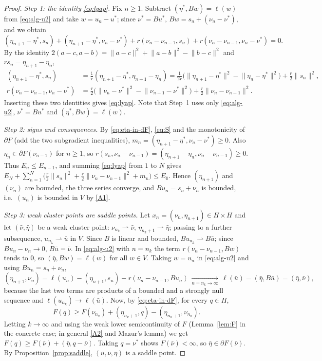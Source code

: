\documentclass[11pt]{amsart}
\theoremstyle{definition}
\theoremstyle{remark}
\numberwithin{equation}{section}
\newcommand{\norm}[1]{\lVert #1\rVert}
\newcommand{\weak}{\rightharpoonup}
\begin{document}
\begin{proof}
\emph{Step 1: the identity \eqref{eq:lyap}.} Fix $n\ge1$. Subtract $(\eta^*,Bw)=\ell(w)$ from \eqref{eq:alg-u2} and take $w=u_n-u^*$; since $\nu^*=Bu^*$, $Bw=s_n+(\nu_n-\nu^*)$, and we obtain
\[
(\eta_{n+1}-\eta^*,s_n)+(\eta_{n+1}-\eta^*,\nu_n-\nu^*)+r(\nu_n-\nu_{n-1},s_n)+r(\nu_n-\nu_{n-1},\nu_n-\nu^*)=0 .
\]
By the identity $2(a-c,a-b)=\norm{a-c}^2+\norm{a-b}^2-\norm{b-c}^2$ and $rs_n=\eta_{n+1}-\eta_n$,
\begin{align*}
(\eta_{n+1}-\eta^*,s_n)&=\frac1r(\eta_{n+1}-\eta^*,\eta_{n+1}-\eta_n)=\frac1{2r}\big(\norm{\eta_{n+1}-\eta^*}^2-\norm{\eta_n-\eta^*}^2\big)+\frac r2\norm{s_n}^2,\\
r(\nu_n-\nu_{n-1},\nu_n-\nu^*)&=\frac r2\big(\norm{\nu_n-\nu^*}^2-\norm{\nu_{n-1}-\nu^*}^2\big)+\frac r2\norm{\nu_n-\nu_{n-1}}^2 .
\end{align*}
Inserting these two identities gives \eqref{eq:lyap}. Note that Step~1 uses only \eqref{eq:alg-u2}, $\nu^*=Bu^*$ and $(\eta^*,Bw)=\ell(w)$.

\emph{Step 2: signs and consequences.} By \eqref{eq:eta-in-dF}, \eqref{eq:S} and the monotonicity of $\partial F$ (add the two subgradient inequalities), $m_n=(\eta_{n+1}-\eta^*,\nu_n-\nu^*)\ge0$. Also $\eta_n\in\partial F(\nu_{n-1})$ for $n\ge1$, so $r(s_n,\nu_n-\nu_{n-1})=(\eta_{n+1}-\eta_n,\nu_n-\nu_{n-1})\ge0$. Thus $E_n\le E_{n-1}$, and summing \eqref{eq:lyap} from $1$ to $N$ gives $E_N+\sum_{n=1}^N\big(\frac r2\norm{s_n}^2+\frac r2\norm{\nu_n-\nu_{n-1}}^2+m_n\big)\le E_0$. Hence $(\eta_{n+1})$ and $(\nu_n)$ are bounded, the three series converge, and $Bu_n=s_n+\nu_n$ is bounded, i.e.\ $(u_n)$ is bounded in $V$ by \ref{A1}.

\emph{Step 3: weak cluster points are saddle points.} Let $x_n=(\nu_n,\eta_{n+1})\in H\times H$ and let $(\bar\nu,\bar\eta)$ be a weak cluster point: $\nu_{n_k}\weak\bar\nu$, $\eta_{n_k+1}\weak\bar\eta$; passing to a further subsequence, $u_{n_k}\weak\bar u$ in $V$. Since $B$ is linear and bounded, $Bu_{n_k}\weak B\bar u$; since $Bu_n-\nu_n\to0$, $B\bar u=\bar\nu$. In \eqref{eq:alg-u2} with $n=n_k$ the term $r(\nu_n-\nu_{n-1},Bw)$ tends to $0$, so $(\bar\eta,Bw)=\ell(w)$ for all $w\in V$. Taking $w=u_n$ in \eqref{eq:alg-u2} and using $Bu_n=s_n+\nu_n$,
\[
(\eta_{n+1},\nu_n)=\ell(u_n)-(\eta_{n+1},s_n)-r(\nu_n-\nu_{n-1},Bu_n)\ \xrightarrow[n=n_k\to\infty]{}\ \ell(\bar u)=(\bar\eta,B\bar u)=(\bar\eta,\bar\nu),
\]
because the last two terms are products of a bounded and a strongly null sequence and $\ell(u_{n_k})\to\ell(\bar u)$. Now, by \eqref{eq:eta-in-dF}, for every $q\in H$,
\[
F(q)\ge F(\nu_{n_k})+(\eta_{n_k+1},q)-(\eta_{n_k+1},\nu_{n_k}).
\]
Letting $k\to\infty$ and using the weak lower semicontinuity of $F$ (Lemma~\ref{lem:F} in the concrete case; in general \ref{A2} and Mazur's lemma) we get $F(q)\ge F(\bar\nu)+(\bar\eta,q-\bar\nu)$. Taking $q=\nu^*$ shows $F(\bar\nu)<\infty$, so $\bar\eta\in\partial F(\bar\nu)$. By Proposition~\ref{prop:saddle}, $(\bar u,\bar\nu,\bar\eta)$ is a saddle point.


\end{proof}
\end{document}
